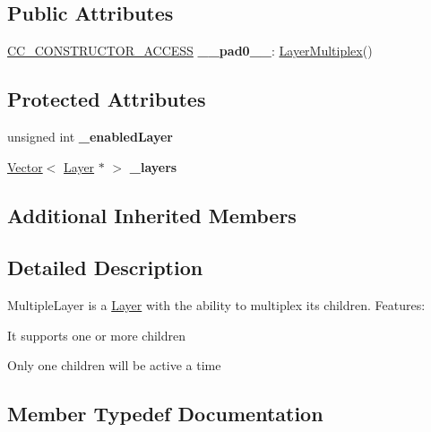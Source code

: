 \subsection*{Public Attributes}
\begin{DoxyCompactItemize}
\item 
\mbox{\label{classLayerMultiplex_a5692d7d7eb83603b19ffc1019b2e7ab5}} 
\hyperlink{_2cocos2d_2cocos_2base_2ccConfig_8h_a25ef1314f97c35a2ed3d029b0ead6da0}{C\+C\+\_\+\+C\+O\+N\+S\+T\+R\+U\+C\+T\+O\+R\+\_\+\+A\+C\+C\+E\+SS} {\bfseries \+\_\+\+\_\+pad0\+\_\+\+\_\+}\+: \hyperlink{classLayerMultiplex}{Layer\+Multiplex}()
\end{DoxyCompactItemize}
\subsection*{Protected Attributes}
\begin{DoxyCompactItemize}
\item 
\mbox{\label{classLayerMultiplex_ab51411d1c0292614de460e5c625e730c}} 
unsigned int {\bfseries \+\_\+enabled\+Layer}
\item 
\mbox{\label{classLayerMultiplex_a5a4144e5f23af02ec44ea35cd0d6ea16}} 
\hyperlink{classVector}{Vector}$<$ \hyperlink{classLayer}{Layer} $\ast$ $>$ {\bfseries \+\_\+layers}
\end{DoxyCompactItemize}
\subsection*{Additional Inherited Members}


\subsection{Detailed Description}
Multiple\+Layer is a \hyperlink{classLayer}{Layer} with the ability to multiplex it\textquotesingle{}s children. Features\+: 


\begin{DoxyItemize}
\item It supports one or more children
\item Only one children will be active a time 
\end{DoxyItemize}

\subsection{Member Typedef Documentation}
\mbox{\label{classLayerMultiplex_a47ea9ae27cb9c95490a017ab01952487}} 
